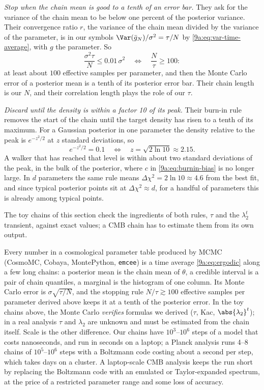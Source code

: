 \emph{Stop when the chain mean is good to a tenth of an error bar.} They ask for the variance of
the chain mean to be below one percent of the posterior variance. Their convergence ratio $r$,
the variance of the chain mean divided by the variance of the parameter, is in our symbols
$\Var(\bar g_N)/\sigma^2=\tau/N$ by \eqref{9a:eq:var-time-average}, with $g$ the parameter. So
\begin{equation*}
  \frac{\sigma^2\tau}{N}\le0.01\,\sigma^2
  \quad\Longleftrightarrow\quad
  \frac N\tau\ge100:
\end{equation*}
at least about $100$ effective samples per parameter, and then the Monte Carlo error of a posterior
mean is a tenth of its posterior error bar. Their chain length is our $N$, and their correlation
length plays the role of our $\tau$.

\emph{Discard until the density is within a factor 10 of its peak.} Their burn-in rule removes
the start of the chain until the target density has risen to a tenth of its maximum. For a
Gaussian posterior in one parameter the density relative to the peak is $e^{-z^2/2}$ at $z$
standard deviations, so
\begin{equation*}
  e^{-z^2/2}=0.1\quad\Longleftrightarrow\quad z=\sqrt{2\ln10}\approx2.15 .
\end{equation*}
A walker that has reached that level is within about two standard deviations of the peak, in the
bulk of the posterior, where $c$ in \eqref{9a:eq:burnin-bias} is no longer large. In $d$
parameters the same rule means $\Delta\chi^2=2\ln10\approx4.6$ from the best fit, and since
typical posterior points sit at $\Delta\chi^2\approx d$, for a handful of parameters this is
already among typical points.

The toy chains of this section check the ingredients of both rules, $\tau$ and the $\lambda_2^t$
transient, against exact values; a CMB chain has to estimate them from its own output.

\begin{inpractice}
Every number in a cosmological parameter table produced by MCMC (CosmoMC, Cobaya, MontePython,
\texttt{emcee}) is a time average \eqref{9a:eq:ergodic} along a few long chains: a posterior mean is
the chain mean of $\theta$, a credible interval is a pair of chain quantiles, a marginal is the
histogram of one column. Its Monte Carlo error is $\sigma\sqrt{\tau/N}$, and the stopping rule
$N/\tau\gtrsim100$ effective samples per parameter derived above keeps it at a tenth of the
posterior error. In the toy chains
above, the Monte Carlo \emph{verifies} formulas we derived ($\tau$, Kac, $\abs{\lambda_2}^t$); in a
real analysis $\tau$ and $\lambda_2$ are unknown and must be estimated from the chain itself. Scale
is the other difference. Our chains have $10^3$--$10^6$ steps of a model that costs nanoseconds,
and run in seconds on a laptop; a Planck analysis runs 4--8 chains of $10^5$--$10^6$ steps with a
Boltzmann code costing about a second per step, which takes days on a cluster. A laptop-scale CMB
analysis keeps the run short by replacing the Boltzmann code with an emulated or
Taylor-expanded spectrum, at the price of a restricted parameter range and some loss of
accuracy.
\end{inpractice}
